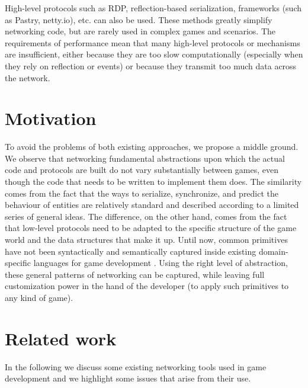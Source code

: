 High-level protocols such as RDP, reflection-based serialization, frameworks (such as Pastry, netty.io), etc. can also be used. These methods greatly simplify networking code, but are rarely used in complex games and scenarios. The requirements of performance mean that many high-level protocols or mechanisms are insufficient, either because they are too slow computationally (especially when they rely on reflection or events) or because they transmit too much data across the network.

\section{Motivation}

To avoid the problems of both existing approaches, we propose a middle ground. We observe that networking fundamental abstractions upon which the actual code and protocols are built do not vary substantially between games, even though the code that needs to be written to implement them does. The similarity comes from the fact that the ways to serialize, synchronize, and predict the behaviour of entities are relatively standard and described according to a limited series of general ideas. The difference, on the other hand, comes from the fact that low-level protocols need to be adapted to the specific structure of the game world and the data structures that make it up. Until now, common primitives have not been syntactically and semantically captured inside existing domain-specific languages for game development \cite{bhatti2009domain}. Using the right level of abstraction, these general patterns of networking can be captured, while leaving full customization power in the hand of the developer (to apply such primitives to any kind of game).

\section{Related work}
In the following we discuss some existing networking tools used in game development and we highlight some issues that arise from their use.

